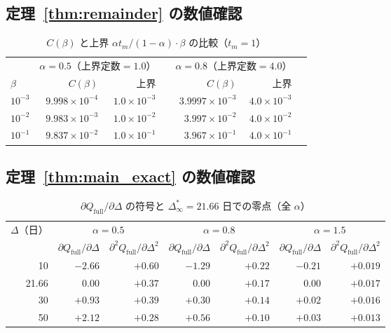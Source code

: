 \documentclass[12pt,a4paper]{article}
\theoremstyle{plain}
\theoremstyle{definition}
\theoremstyle{remark}
\newcommand{\Qf}{Q_{\mathrm{full}}}
\newcommand{\Dinf}{\Delta^{*}_{\infty}}
\begin{document}
\subsection{定理~\ref{thm:remainder} の数値確認}

\begin{table}[h]
\centering
\caption{$C(\beta)$ と上界 $\alpha t_m/(1-\alpha)\cdot\beta$ の比較（$t_m=1$）}
\label{tab:remainder}
\begin{tabular}{@{}lrrlrrl@{}}
\toprule
& \multicolumn{2}{c}{$\alpha=0.5$（上界定数$=1.0$）} &&
\multicolumn{2}{c}{$\alpha=0.8$（上界定数$=4.0$）}\\
\cmidrule{2-3}\cmidrule{5-6}
$\beta$ & $C(\beta)$ & 上界 && $C(\beta)$ & 上界 \\
\midrule
$10^{-3}$ & $9.998\times10^{-4}$ & $1.0\times10^{-3}$ &&
$3.9997\times10^{-3}$ & $4.0\times10^{-3}$ \\
$10^{-2}$ & $9.983\times10^{-3}$ & $1.0\times10^{-2}$ &&
$3.997\times10^{-2}$ & $4.0\times10^{-2}$ \\
$10^{-1}$ & $9.837\times10^{-2}$ & $1.0\times10^{-1}$ &&
$3.967\times10^{-1}$ & $4.0\times10^{-1}$ \\
\bottomrule
\end{tabular}
\end{table}

\subsection{定理~\ref{thm:main_exact} の数値確認}

\begin{table}[h]
\centering
\caption{$\partial\Qf/\partial\Delta$ の符号と $\Dinf=21.66$ 日での零点（全 $\alpha$）}
\label{tab:dQ}
\begin{tabular}{@{}rrrrrrr@{}}
\toprule
\multirow{2}{*}{$\Delta$（日）} & 
\multicolumn{2}{c}{$\alpha=0.5$} & 
\multicolumn{2}{c}{$\alpha=0.8$} &
\multicolumn{2}{c}{$\alpha=1.5$} \\
\cmidrule{2-3}\cmidrule{4-5}\cmidrule{6-7}
& $\partial\Qf/\partial\Delta$ & $\partial^2\Qf/\partial\Delta^2$ &
$\partial\Qf/\partial\Delta$ & $\partial^2\Qf/\partial\Delta^2$ &
$\partial\Qf/\partial\Delta$ & $\partial^2\Qf/\partial\Delta^2$ \\
\midrule
10 & $-2.66$ & $+0.60$ & $-1.29$ & $+0.22$ & $-0.21$ & $+0.019$ \\
21.66 & $0.00$ & $+0.37$ & $0.00$ & $+0.17$ & $0.00$ & $+0.017$ \\
30 & $+0.93$ & $+0.39$ & $+0.30$ & $+0.14$ & $+0.02$ & $+0.016$ \\
50 & $+2.12$ & $+0.28$ & $+0.56$ & $+0.10$ & $+0.03$ & $+0.013$ \\
\bottomrule
\end{tabular}
\end{table}
\end{document}
